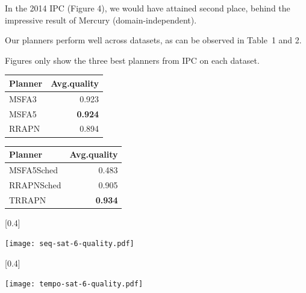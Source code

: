 \documentclass[a0paper,portrait,fontscale=0.2975]{TUTposter} %
\begin{document}
\begin{poster}
{\begin{multicols}{2}
\begin{flushleft}
\vspace{0.5em}
In the 2014 IPC (Figure 4), we would have attained second place, behind the impressive result of Mercury (domain-independent).

\vspace{0.5em}
Our planners perform well across datasets, as can be observed in Table~1 and 2.

\vspace{0.7em}
\footnotesize{Figures only show the three best planners from IPC on
each dataset.}

\begin{center}
\small
\begin{tabular}{lr}
\toprule
\textbf{Planner} & \textbf{Avg.\;quality}\\
\midrule
MSFA3 & 0.923\\
MSFA5 & \textbf{0.924}\\
RRAPN & 0.894\\
\bottomrule
\end{tabular}
\vspace{-0.5em}

\vspace{1em}
\begin{tabular}{lr}
\toprule
\textbf{Planner} & \textbf{Avg.\;quality}\\
\midrule
MSFA5Sched & 0.483\\
RRAPNSched & 0.905\\
TRRAPN & \textbf{0.934}\\
\bottomrule
\end{tabular}
\vspace{-0.5em}
\end{center}
\end{flushleft}
\end{multicols}

\vspace{-1.5em}
\begin{center}
[0.4\paperwidth]
{\caption{\textbf{Figure 1:} IPC 2008\\Sequential satisficing}}
{\texttt{[image: seq-sat-6-quality.pdf]}}

\vspace{0.4em}
[0.4\paperwidth]
{\caption{\textbf{Figure 2:} IPC 2008\\Temporal satisficing}}
{\texttt{[image: tempo-sat-6-quality.pdf]}}


\end{center}}
\end{poster}
\end{document}
